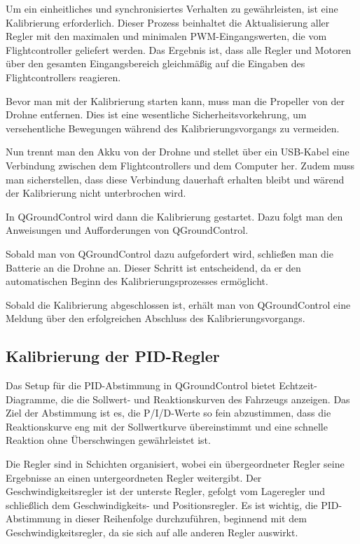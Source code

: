 Um ein einheitliches und synchronisiertes Verhalten zu gewährleisten, ist eine Kalibrierung erforderlich. Dieser Prozess beinhaltet die Aktualisierung aller Regler mit den maximalen und minimalen PWM-Eingangswerten, die vom Flightcontroller geliefert werden. Das Ergebnis ist, dass alle Regler und Motoren über den gesamten Eingangsbereich gleichmäßig auf die Eingaben des Flightcontrollers reagieren.

Bevor man mit der Kalibrierung starten kann, muss man die Propeller von der Drohne entfernen. Dies ist eine wesentliche Sicherheitsvorkehrung, um versehentliche Bewegungen während des Kalibrierungsvorgangs zu vermeiden.

Nun trennt man den Akku von der Drohne und stellet über ein USB-Kabel eine Verbindung zwischen dem Flightcontrollers und dem Computer her. Zudem muss man sicherstellen, dass diese Verbindung dauerhaft erhalten bleibt und wärend der Kalibrierung nicht unterbrochen wird.

In QGroundControl wird dann die Kalibrierung gestartet. Dazu folgt man den Anweisungen und Aufforderungen von QGroundControl.

Sobald man von QGroundControl dazu aufgefordert wird, schließen man die Batterie an die Drohne an. Dieser Schritt ist entscheidend, da er den automatischen Beginn des Kalibrierungsprozesses ermöglicht.

Sobald die Kalibrierung abgeschlossen ist, erhält man von QGroundControl eine Meldung über den erfolgreichen Abschluss des Kalibrierungsvorgangs.

\subsection{Kalibrierung der PID-Regler}
Das Setup für die PID-Abstimmung in QGroundControl bietet Echtzeit-Diagramme, die die Sollwert- und Reaktionskurven des Fahrzeugs anzeigen. Das Ziel der Abstimmung ist es, die P/I/D-Werte so fein abzustimmen, dass die Reaktionskurve eng mit der Sollwertkurve übereinstimmt und eine schnelle Reaktion ohne Überschwingen gewährleistet ist.

Die Regler sind in Schichten organisiert, wobei ein übergeordneter Regler seine Ergebnisse an einen untergeordneten Regler weitergibt. Der Geschwindigkeitsregler ist der unterste Regler, gefolgt vom Lageregler und schließlich dem Geschwindigkeits- und Positionsregler. Es ist wichtig, die PID-Abstimmung in dieser Reihenfolge durchzuführen, beginnend mit dem Geschwindigkeitsregler, da sie sich auf alle anderen Regler auswirkt.

